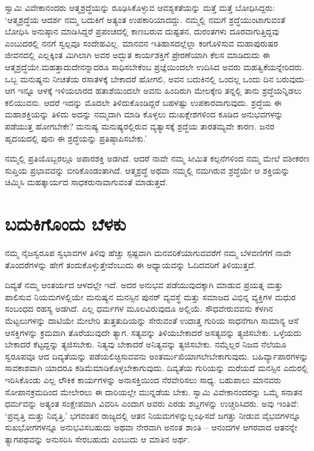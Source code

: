 ಸ್ವಾಮಿ ವಿವೇಕಾನಂದರು ಆತ್ಮಶ್ರದ್ಧೆಯನ್ನು ರೂಢಿಸಿಕೊಳ್ಳುವ ಆವಶ್ಯಕತೆಯನ್ನು ಮತ್ತೆ ಮತ್ತೆ ಬೋಧಿಸಿದ್ದರು: ‘ಆತ್ಮಶ್ರದ್ಧೆಯ ಆದರ್ಶ ನಮ್ಮ ಬದುಕಿಗೆ ಅತ್ಯಂತ ಉಪಕಾರಿಯಾದದ್ದು. ನಮ್ಮಲ್ಲಿ ನಮಗೆ ಶ್ರದ್ಧೆಯುಂಟಾಗುವಂತೆ ಬೋಧಿಸಿ ಅನುಷ್ಠಾನ ಮಾಡಿಸಿದ್ದರೆ ಪ್ರಪಂಚದಲ್ಲಿ ಕಾಣಬರುವ ದುಷ್ಟತನ, ದುರಂತಗಳು ದೂರವಾಗುತ್ತಿದ್ದವು ಎಂಬುದರಲ್ಲಿ ನನಗೆ ಸ್ವಲ್ಪವೂ ಸಂದೇಹವಿಲ್ಲ. ಮಾನವನ ಇತಿಹಾಸದಲ್ಲೆಲ್ಲಾ ಕಂಗೊಳಿಸುವ ಮಹಾಪುರುಷರ ಜೀವನದಲ್ಲಿ ಎಲ್ಲಕ್ಕಿಂತ ಮಿಗಿಲಾಗಿ ಅವರ ಅದ್ಭುತ ಕಾರ್ಯಶಕ್ತಿಗೆ ಪ್ರೇರಣೆಯಾಗಿ ಕೆಲಸ ಮಾಡಿದುದು ಈ ಆತ್ಮಶ್ರದ್ಧೆಯೇ.\break ಮಹತ್ತಾದುದೇನನ್ನಾದರೂ ಸಾಧಿಸಬೇಕೆಂಬ ಪ್ರಜ್ಞೆಯಿಂದಲೇ ಉದಿಸಿದ ಅವರು ಮಹತ್ವಿಕೆ\-ಯನ್ನೇ\-ರಿದರು. ಒಬ್ಬ ಮನುಷ್ಯನು ನೀಚತೆಯ ರಸಾತಳಕ್ಕೆ ಬೇಕಾದರೆ ಹೋಗಲಿ, ಅವನ ಬದುಕಿನಲ್ಲಿ ಒಂದಲ್ಲ ಒಂದು ದಿನ ಬರುವುದು–ಆಗ ಇನ್ನೂ ಆಳಕ್ಕೆ ಇಳಿಯಲಾರದ ಹತಾಶೆಯಿಂದಲೇ ಅವನು ಹಿಂದಿರುಗಿ ಮೇಲಕ್ಕೇರಿ ತನ್ನಲ್ಲಿ ತಾನು ಶ್ರದ್ಧೆಯನ್ನಿಡಲು ಕಲಿಯುವನು. ಆದರೆ ಇದನ್ನು ಮೊದಲೇ ತಿಳಿದುಕೊಂಡಿದ್ದರೆ ಬಹಳಷ್ಟು ಉಪಕಾರವಾಗುವುದು. ಶ್ರದ್ಧೆಯ ಈ ಮಹಾಶಕ್ತಿಯನ್ನು ತಿಳಿದು ಅದನ್ನು ನಮ್ಮದಾಗಿ ಮಾಡಿ ಕೊಳ್ಳಲು ದುಃಖಕ್ಲೇಶಗಳಿಂದ ಕೂಡಿದ ಅನುಭವಗಳನ್ನು ಪಡೆಯುತ್ತ ಹೋಗಬೇಕೇ? ಮನುಷ್ಯ ಮನುಷ್ಯರಲ್ಲಿರುವ ವ್ಯತ್ಯಾಸಕ್ಕೆ ಶ್ರದ್ಧೆಯ ತಾರತಮ್ಯವೇ ಕಾರಣ. ಜನರ ಹೃದಯದಲ್ಲಿ ಪುನಃ ಈ ಶ್ರದ್ಧೆಯನ್ನು ಪ್ರತಿಷ್ಠಾಪಿಸಬೇಕು.’

ನಮ್ಮಲ್ಲಿ ಪ್ರತಿಯೊಬ್ಬರಲ್ಲೂ ಅಪಾರಶಕ್ತಿ ಅಡಗಿದೆ. ಆದರೆ ನಾವೇ ನಮ್ಮ ಸೀಮಿತ ಕಲ್ಪನೆಗಳಿಂದ ನಮ್ಮ ಮೇಲೆ ವಶೀಕರಣ ಸುಪ್ತಿಯ ಪ್ರಭಾವವನ್ನು ಬೀರಿಕೊಂಡಂತಾಗಿದೆ. ಆತ್ಮಶ್ರದ್ಧೆ ಅಥವಾ ನಮ್ಮಲ್ಲಿ ನಮಗಿರುವ ಶ್ರದ್ಧೆಯೇ ಆ ಶಕ್ತಿಯನ್ನು ಚಿಮ್ಮಿಸಿ ಮಹತ್ಕಾರ್ಯದ ಸಾಧಕರು\break ನಾವಾಗುವಂತೆ ಮಾಡುತ್ತದೆ.


\section*{ಬದುಕಿಗೊಂದು ಬೆಳಕು}

\vskip -5pt

ನಮ್ಮ ನೈಜಸ್ವರೂಪ ಸ್ವಭಾವಗಳ ತಿಳಿವು ಹೆಚ್ಚು ಸ್ಪಷ್ಟವಾಗಿ ಮನವರಿಕೆಯಾಗುವವರೆಗೆ ನಮ್ಮ ಬೆಳವಣಿಗೆಗೆ ನಾವೇ ತೊಂದರೆಗಳನ್ನು ಹೇಗೆ ತಂದುಕೊಳ್ಳುತ್ತೇವೆಂಬುದು ಈ ಅಧ್ಯಾಯವನ್ನು ಓದಿದವರಿಗೆ ತಿಳಿಯುತ್ತದೆ.

ದಿವ್ಯತೆ ನಮ್ಮ ಆಂತರ್ಯದ ಆಳದಲ್ಲೇ ಇದೆ. ಅದರ ಅನುಭವ ಪಡೆಯುವುದಕ್ಕಾಗಿ ಮಾಡುವ ಪ್ರಯತ್ನ ಮತ್ತು ಪಾಲಿಸುವ ನಿಯಮಗಳಲ್ಲಿಯೇ ಮನುಷ್ಯನ ಮನಸ್ಸಿನ ಪುನರ್ ವ್ಯವಸ್ಥೆ ಮತ್ತು ಸಮಾಜದ ವಿಭಿನ್ನ ವ್ಯಕ್ತಿಗಳ ಮಧುರ ಸಂಬಂಧದ ರಹಸ್ಯ ಅಡಗಿದೆ. ಎಲ್ಲ ಧರ್ಮಗಳ ಮೂಲವಿರುವುದೂ ಅಲ್ಲಿಯೆ. ಸೌಧವೇರುವವನು ಕೆಳಗಿನ ಮೆಟ್ಟಲುಗಳನ್ನು ದಾಟಿಯೇ ಮೇಲೇರಿ ತುತ್ತತುದಿಯನ್ನು ಸೇರುವಂತೆ ಉದಾತ್ತ ಗುರಿಯ ಸಾಧನೆಗಾಗಿ ಸಾಮಾನ್ಯ ಆಸೆ ಆಸಕ್ತಿಗಳನ್ನು ಕ್ರಮವಾಗಿ ತೊರೆಯುವುದೇ ತ್ಯಾಗ. ಸತ್ಯವನ್ನು ತಿಳಿಯಬೇಕಾದರೆ ಅಸತ್ಯವನ್ನು ತ್ಯಜಿಸಬೇಕು. ಒಳ್ಳೆಯದು ಬೇಕಾದರೆ ಕೆಟ್ಟದ್ದನ್ನು ತ್ಯಜಿಸಬೇಕು. ನಿತ್ಯವು ಬೇಕಾದರೆ ಅನಿತ್ಯವನ್ನು ತ್ಯಜಿಸಬೇಕು. ನಮ್ಮೆಲ್ಲರ ನಿಜದ ನೆಲೆಯೂ ಸ್ವರೂಪವೂ ಆದ ದಿವ್ಯತೆಯನ್ನು ಪಡೆಯಲಿಚ್ಛಿಸುವವನು ಅಂತರ್ಮುಖಿಯಾಗಲೇಬೇಕಾಗುವುದು. ಬಹಿರ್ವ್ಯಾಪಾರಗಳನ್ನು ಸಾವಕಾಶವಾಗಿ ಯಾದರೂ ಕಡಿಮೆಮಾಡಿಕೊಳ್ಳಬೇಕಾಗುವುದು. ದಿವ್ಯತೆಯ ಗುರಿಯನ್ನು ಮರೆಯದೆ ಮನಸ್ಸಿನ ಎದುರಲ್ಲಿ ಇರಿಸಿಕೊಂಡು ಎಲ್ಲ ಲೌಕಿಕ ಕಾರ್ಯಗಳನ್ನು ಅನಾಸಕ್ತಿಯಿಂದ ನೆರವೇರಿಸಲು ಸಾಧ್ಯ. ಬಹುಪಾಲು ಮಾನವರು ಸೋಪಾನಕ್ರಮದಿಂದ ಮೇಲೇರಲು ಈ ದಾರಿಯಲ್ಲೇ ಮುನ್ನಡೆಯ ಬೇಕು. ಸ್ವಾಮಿ ವಿವೇಕಾನಂದರನ್ನು ಒಮ್ಮೆ ಸನಾತನ ಧರ್ಮವನ್ನು ಅತ್ಯಂತ ಸಂಕ್ಷೇಪವಾಗಿ ವಿವರಿಸಿ ಎಂದಾಗ ಅವರು ಎರಡು ಶಬ್ದಗಳನ್ನು ಉಚ್ಚರಿಸಿದರು. ಅವು ಇಂತಿವೆ: ‘ಪ್ರವೃತ್ತಿ ಮತ್ತು ನಿವೃತ್ತಿ.’ ಭಗವಂತನ ರಾಜ್ಯದಲ್ಲಿ ಆತನ ನಿಯಮಗಳನ್ನುಲ್ಲಂಘಿಸದೆ ಜಗತ್ತು ನೀಡುವ ವೈಭವಗಳನ್ನೂ ಸುಖಭೋಗಗಳನ್ನೂ ಅನುಭವಿಸಬಹುದು ಅಥವಾ ನೇರವಾಗಿ ಅನಂತ ಶಾಂತಿ – ಆನಂದಗಳ ಆಗರವಾದ ಆತನನ್ನೇ ತ್ಯಾಗಪಥವನ್ನು ಅನುಸರಿಸಿ ಸೇರಬಹುದು ಎಂಬುದು ಆ ಮಾತಿನ ಅರ್ಥ.

